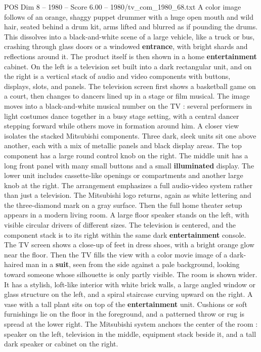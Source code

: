 \begin{textsample}{POS Dim 8 – 1980 – Score 6.00 – 1980/tv\_com\_1980\_68.txt}
A color image follows of an orange, shaggy puppet drummer with a huge open mouth and wild hair, seated behind a drum kit, arms lifted and blurred as if pounding the drums.
This dissolves into a black-and-white scene of a large vehicle, like a truck or bus, crashing through glass doors or a windowed \textbf{entrance}, with bright shards and reflections around it.
The product itself is then shown in a home \textbf{entertainment} cabinet.
On the left is a television set built into a dark rectangular unit, and on the right is a vertical stack of audio and video components with buttons, displays, slots, and panels.
The television screen first shows a basketball game on a court, then changes to dancers lined up in a stage or film musical.
The image moves into a black-and-white musical number on the TV : several performers in light costumes dance together in a busy stage setting, with a central dancer stepping forward while others move in formation around him.
A closer view isolates the stacked Mitsubishi components.
Three dark, sleek units sit one above another, each with a mix of metallic panels and black display areas.
The top component has a large round control knob on the right.
The middle unit has a long front panel with many small buttons and a small \textbf{illuminated} display.
The lower unit includes cassette-like openings or compartments and another large knob at the right.
The arrangement emphasizes a full audio-video system rather than just a television.
The Mitsubishi logo returns, again as white lettering and the three-diamond mark on a gray surface.
Then the full home theater setup appears in a modern living room.
A large floor speaker stands on the left, with visible circular drivers of different sizes.
The television is centered, and the component stack is to its right within the same dark \textbf{entertainment} console.
The TV screen shows a close-up of feet in dress shoes, with a bright orange glow near the floor.
Then the TV fills the view with a color movie image of a dark-haired man in a \textbf{suit}, seen from the side against a pale background, looking toward someone whose silhouette is only partly visible.
The room is shown wider.
It has a stylish, loft-like interior with white brick walls, a large angled window or glass structure on the left, and a spiral staircase curving upward on the right.
A vase with a tall plant sits on top of the \textbf{entertainment} unit.
Cushions or soft furnishings lie on the floor in the foreground, and a patterned throw or rug is spread at the lower right.
The Mitsubishi system anchors the center of the room : speaker on the left, television in the middle, equipment stack beside it, and a tall dark speaker or cabinet on the right.

\end{textsample}
